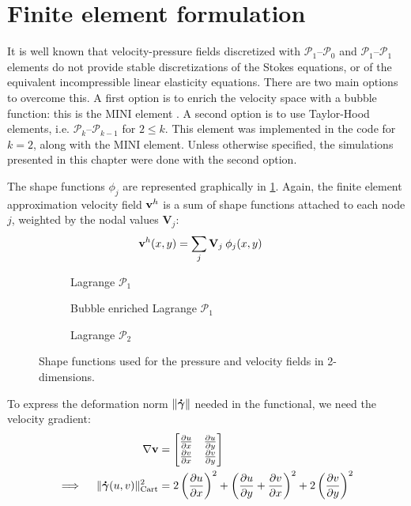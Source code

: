 \documentclass[11 pt]{report}
\begin{document}
\section{Finite element formulation}
It is well known that velocity-pressure fields discretized with $\mathcal{P}_1$--$\mathcal{P}_0$ and $\mathcal{P}_1$--$\mathcal{P}_1$ elements do not provide stable discretizations of the Stokes equations, or of the equivalent incompressible linear elasticity equations. There are two main options to overcome this. A first option is to enrich the velocity space with a bubble function: this is the MINI element \cite{ministable}. A second option is to use Taylor-Hood elements, i.e. $\mathcal{P}_k$--$\mathcal{P}_{k-1}$ for $2 \leq k$. This element was implemented in the code for $k=2$, along with the MINI element. Unless otherwise specified, the simulations presented in this chapter were done with the second option.

The shape functions $\phi_j$ are represented graphically in \cref{fig:shape_functions_2d}. Again, the finite element approximation velocity field $\mathbf{v}^h$ is a sum of shape functions attached to each node $j$, weighted by the nodal values $\mathbf{V}_j$:
\begin{align}
    \mathbf{v}^h(x, y) &= \sum_{j} \mathbf{V}_j \: \phi_j(x, y)
\end{align}

\begin{figure}[t]
    \centering
    \begin{subfigure}[t]{0.495\textwidth}
        
        \caption{Lagrange $\mathcal{P}_1$}
    \end{subfigure}
    \begin{subfigure}[t]{0.495\textwidth}
        
        \caption{Bubble enriched Lagrange $\mathcal{P}_1$}
    \end{subfigure}
    \begin{subfigure}[b]{\textwidth}
        
        \caption{Lagrange $\mathcal{P}_2$}
    \end{subfigure}
    \caption{Shape functions used for the pressure and velocity fields in 2-dimensions.}
    \label{fig:shape_functions_2d}
\end{figure} 

To express the deformation norm $\|\boldsymbol{\dot \gamma}\|$ needed in the functional, we need the velocity gradient:
\begin{align}
    \nabla \mathbf{v} &= 
    \begin{bmatrix}
        \pdv{u}{x} & \pdv{u}{y}\\
        \pdv{v}{x} & \pdv{v}{y}\\
    \end{bmatrix}\\
    \implies \quad \|\boldsymbol{\dot \gamma}(u, v)\|_{\text{Cart}}^2 &= 2 \left(\pdv{u}{x}\right)^2 + \left(\pdv{u}{y} + \pdv{v}{x}\right)^2 + 2\left(\pdv{v}{y}\right)^2
\end{align}
\end{document}
